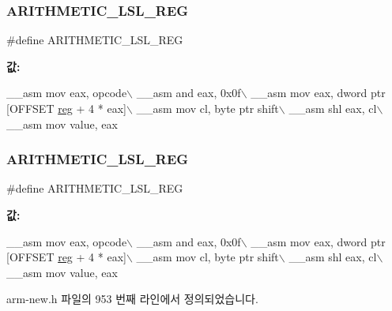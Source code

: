 \subsubsection{\texorpdfstring{A\+R\+I\+T\+H\+M\+E\+T\+I\+C\+\_\+\+L\+S\+L\+\_\+\+R\+EG}{ARITHMETIC\_LSL\_REG}\hspace{0.1cm}{\footnotesize\ttfamily [1/2]}}
{\footnotesize\ttfamily \#define A\+R\+I\+T\+H\+M\+E\+T\+I\+C\+\_\+\+L\+S\+L\+\_\+\+R\+EG}

{\bfseries 값\+:}
\begin{DoxyCode}
\_\_asm mov eax, opcode\(\backslash\)
        \_\_asm and eax, 0x0f\(\backslash\)
        \_\_asm mov eax, dword ptr [OFFSET \mbox{\hyperlink{_g_b_a_8h_ae29faba89509024ffd1a292badcedf2d}{reg}} + 4 * eax]\(\backslash\)
        \_\_asm mov cl, byte ptr shift\(\backslash\)
        \_\_asm shl eax, cl\(\backslash\)
        \_\_asm mov value, eax
\end{DoxyCode}
\mbox{\label{arm-new_8h_a23d5262fc4d82c61d67e8ce48795fcdb}} 
\subsubsection{\texorpdfstring{A\+R\+I\+T\+H\+M\+E\+T\+I\+C\+\_\+\+L\+S\+L\+\_\+\+R\+EG}{ARITHMETIC\_LSL\_REG}\hspace{0.1cm}{\footnotesize\ttfamily [2/2]}}
{\footnotesize\ttfamily \#define A\+R\+I\+T\+H\+M\+E\+T\+I\+C\+\_\+\+L\+S\+L\+\_\+\+R\+EG}

{\bfseries 값\+:}
\begin{DoxyCode}
\_\_asm mov eax, opcode\(\backslash\)
        \_\_asm and eax, 0x0f\(\backslash\)
        \_\_asm mov eax, dword ptr [OFFSET \mbox{\hyperlink{_g_b_a_8h_ae29faba89509024ffd1a292badcedf2d}{reg}} + 4 * eax]\(\backslash\)
        \_\_asm mov cl, byte ptr shift\(\backslash\)
        \_\_asm shl eax, cl\(\backslash\)
        \_\_asm mov value, eax
\end{DoxyCode}


arm-\/new.\+h 파일의 953 번째 라인에서 정의되었습니다.

\mbox{\label{_g_b_a_8cpp_a8be5e0a331d3bc7956ff3310ffe86b71}} 

